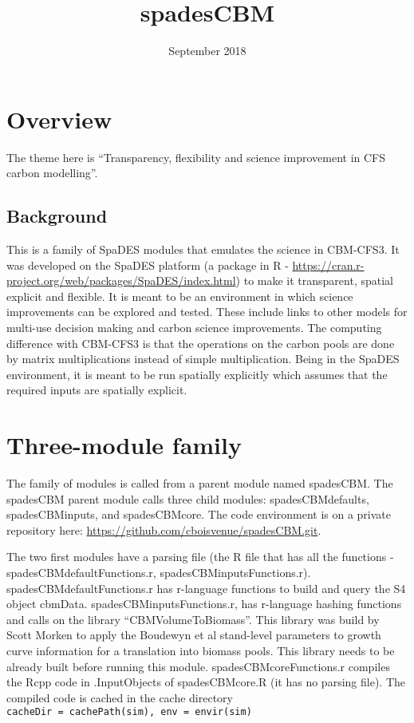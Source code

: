 \documentclass[]{article}
\title{spadesCBM}
\author{}
\date{September 2018}
\begin{document}
\maketitle

\section{Overview}\label{overview}

The theme here is ``Transparency, flexibility and science improvement in
CFS carbon modelling''.

\subsection{Background}\label{background}

This is a family of SpaDES modules that emulates the science in
CBM-CFS3. It was developed on the SpaDES platform (a package in R -
\url{https://cran.r-project.org/web/packages/SpaDES/index.html}) to make
it transparent, spatial explicit and flexible. It is meant to be an
environment in which science improvements can be explored and tested.
These include links to other models for multi-use decision making and
carbon science improvements. The computing difference with CBM-CFS3 is
that the operations on the carbon pools are done by matrix
multiplications instead of simple multiplication. Being in the SpaDES
environment, it is meant to be run spatially explicitly which assumes
that the required inputs are spatially explicit.

\section{Three-module family}\label{three-module-family}

The family of modules is called from a parent module named spadesCBM.
The spadesCBM parent module calls three child modules:
spadesCBMdefaults, spadesCBMinputs, and spadesCBMcore. The code
environment is on a private repository here:
\url{https://github.com/cboisvenue/spadesCBM.git}.

The two first modules have a parsing file (the R file that has all the
functions - spadesCBMdefaultFunctions.r, spadesCBMinputsFunctions.r).
spadesCBMdefaultFunctions.r has r-language functions to build and query
the S4 object cbmData. spadesCBMinputsFunctions.r, has r-language
hashing functions and calls on the library ``CBMVolumeToBiomass''. This
library was build by Scott Morken to apply the Boudewyn et al
stand-level parameters to growth curve information for a translation
into biomass pools. This library needs to be already built before
running this module. spadesCBMcoreFunctions.r compiles the Rcpp code in
.InputObjects of spadesCBMcore.R (it has no parsing file). The compiled
code is cached in the cache directory
\texttt{cacheDir\ =\ cachePath(sim),\ env\ =\ envir(sim)}
\end{document}
